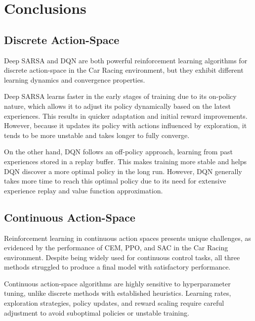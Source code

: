 \documentclass[../CSC_52081_EP.tex]{subfiles}
\begin{document}
    \section{Conclusions}
        \subsection{Discrete Action-Space}

        Deep SARSA and DQN are both powerful reinforcement learning algorithms for discrete action-space in the Car Racing environment, but they exhibit different learning dynamics and convergence properties.

        Deep SARSA learns faster in the early stages of training due to its on-policy nature, which allows it to adjust its policy dynamically based on the latest experiences. This results in quicker adaptation and initial reward improvements. However, because it updates its policy with actions influenced by exploration, it tends to be more unstable and takes longer to fully converge.

        On the other hand, DQN follows an off-policy approach, learning from past experiences stored in a replay buffer. This makes training more stable and helps DQN discover a more optimal policy in the long run. However, DQN generally takes more time to reach this optimal policy due to its need for extensive experience replay and value function approximation.

        \subsection{Continuous Action-Space}

        Reinforcement learning in continuous action spaces presents unique challenges, as evidenced by the performance of CEM, PPO, and SAC in the Car Racing environment. Despite being widely used for continuous control tasks, all three methods struggled to produce a final model with satisfactory performance.

        Continuous action-space algorithms are highly sensitive to hyperparameter tuning, unlike discrete methods with established heuristics. Learning rates, exploration strategies, policy updates, and reward scaling require careful adjustment to avoid suboptimal policies or unstable training.
\end{document}
